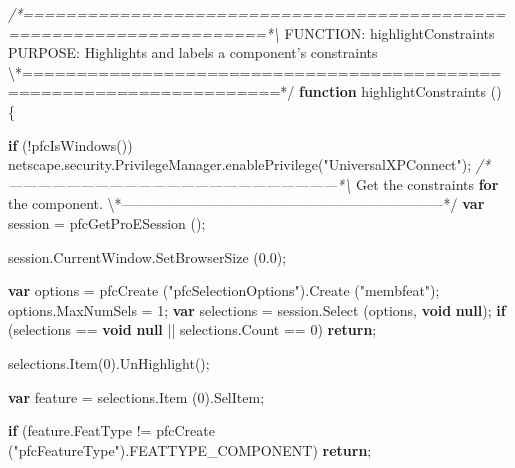 \documentclass[]{article}
\newenvironment{Shaded}{}{}
\newcommand{\KeywordTok}[1]{\textcolor[rgb]{0.00,0.44,0.13}{\textbf{{#1}}}}
\newcommand{\DecValTok}[1]{\textcolor[rgb]{0.25,0.63,0.44}{{#1}}}
\newcommand{\FloatTok}[1]{\textcolor[rgb]{0.25,0.63,0.44}{{#1}}}
\newcommand{\StringTok}[1]{\textcolor[rgb]{0.25,0.44,0.63}{{#1}}}
\newcommand{\CommentTok}[1]{\textcolor[rgb]{0.38,0.63,0.69}{\textit{{#1}}}}
\newcommand{\OtherTok}[1]{\textcolor[rgb]{0.00,0.44,0.13}{{#1}}}
\newcommand{\FunctionTok}[1]{\textcolor[rgb]{0.02,0.16,0.49}{{#1}}}
\newcommand{\NormalTok}[1]{{#1}}
\begin{document}
\begin{Shaded}
\begin{Highlighting}[]
\CommentTok{/*=====================================================================*\textbackslash{}}
\NormalTok{FUNCTION: highlightConstraints}
\NormalTok{PURPOSE:  Highlights and labels a component}\StringTok{'s constraints}
\NormalTok{\textbackslash{}*=====================================================================*}\OtherTok{/}
\KeywordTok{function} \FunctionTok{highlightConstraints} \NormalTok{()}
\NormalTok{\{}
  
  \KeywordTok{if} \NormalTok{(!}\FunctionTok{pfcIsWindows}\NormalTok{())}
    \OtherTok{netscape}\NormalTok{.}\OtherTok{security}\NormalTok{.}\OtherTok{PrivilegeManager}\NormalTok{.}\FunctionTok{enablePrivilege}\NormalTok{(}\StringTok{"UniversalXPConnect"}\NormalTok{);   }
\CommentTok{/*---------------------------------------------------------------------*\textbackslash{}}
  \NormalTok{Get the constraints }\KeywordTok{for} \NormalTok{the }\OtherTok{component}\NormalTok{.}
\NormalTok{\textbackslash{}*---------------------------------------------------------------------*}\OtherTok{/}
  \KeywordTok{var} \NormalTok{session = }\FunctionTok{pfcGetProESession} \NormalTok{();}
  
  \OtherTok{session}\NormalTok{.}\OtherTok{CurrentWindow}\NormalTok{.}\FunctionTok{SetBrowserSize} \NormalTok{(}\FloatTok{0.0}\NormalTok{);}
  
  \KeywordTok{var} \NormalTok{options = }\FunctionTok{pfcCreate} \NormalTok{(}\StringTok{"pfcSelectionOptions"}\NormalTok{).}\FunctionTok{Create} \NormalTok{(}\StringTok{"membfeat"}\NormalTok{);}
  \OtherTok{options}\NormalTok{.}\FunctionTok{MaxNumSels}  \NormalTok{= }\DecValTok{1}\NormalTok{;}
  \KeywordTok{var} \NormalTok{selections = }\OtherTok{session}\NormalTok{.}\FunctionTok{Select} \NormalTok{(options, }\KeywordTok{void} \KeywordTok{null}\NormalTok{);}
  \KeywordTok{if} \NormalTok{(selections == }\KeywordTok{void} \KeywordTok{null} \NormalTok{|| }\OtherTok{selections}\NormalTok{.}\FunctionTok{Count} \NormalTok{== }\DecValTok{0}\NormalTok{)}
    \KeywordTok{return}\NormalTok{;}
  
  \OtherTok{selections}\NormalTok{.}\FunctionTok{Item}\NormalTok{(}\DecValTok{0}\NormalTok{).}\FunctionTok{UnHighlight}\NormalTok{();}
  
  \KeywordTok{var} \NormalTok{feature = }\OtherTok{selections}\NormalTok{.}\FunctionTok{Item} \NormalTok{(}\DecValTok{0}\NormalTok{).}\FunctionTok{SelItem}\NormalTok{;}
  
  \KeywordTok{if} \NormalTok{(}\OtherTok{feature}\NormalTok{.}\FunctionTok{FeatType} \NormalTok{!= }\FunctionTok{pfcCreate} \NormalTok{(}\StringTok{"pfcFeatureType"}\NormalTok{).}\FunctionTok{FEATTYPE_COMPONENT}\NormalTok{)}
    \KeywordTok{return}\NormalTok{;}
  

\end{Highlighting}
\end{Shaded}
\end{document}

